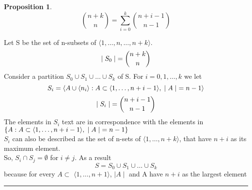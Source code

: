 \documentclass{article}
\newtheorem{prop}[theorem]{Proposition}
\newenvironment{proof}{{\bf Proof:}}{\hfill\rule{2mm}{2mm}}
\begin{document}
\begin{prop}
\[{{n+k} \choose n} = \sum_{i=0}^{k} {{n + i - 1} \choose {n - 1}}\]
\end{prop}

\begin{proof}
Let S be the set of n-subsets of \(\langle 1, \ldots, n, 
\ldots , n + k\rangle\). 
\[\mid S_0 \mid \hspace{0.1cm} = {{n + k} \choose n} \]
Consider a partition \(S_0 \cup S_1 \cup \ldots \cup S_k \) of S. For \(i = 0, 1, \ldots, k\) we let 
\[S_ i = \langle A \cup \langle n _ i \rangle : A \subset \langle 1, \ldots, n + i - 1\rangle , \hspace{0.1cm} \mid A \mid \hspace{0.1cm} = n - 1 \rangle\]
\[\mid S_i \mid \hspace{0.1cm} = {{n+i-1} \choose {n-1}}\]
The elements in \(S_i\) text are in correspondence with the elements in \(\{A : A \subset \langle 1, \ldots, n+i-1 \rangle , \hspace{0.1cm} \mid A \mid \hspace{0.1cm} = n - 1\}\) \\
\newline 
\(S_i\) can also be described as the set of n-sets of \(\langle 1, \ldots, n+k \rangle\), that have \(n+i\) as its maximum element.\\
\newline
So, \(S_i \cap S_j = \emptyset \) for \(i \neq j\). As a result 
\[S = S_0 \cup S_1 \cup \ldots \cup S_k\]
because for every \(A \subset\) \(\langle 1, \ldots, n +1 \rangle\), \hspace{0.1cm} \(\mid A \mid \) \hspace{0.1cm} and A have \(n+i\) as the largest element
\end{proof}
\end{document}

